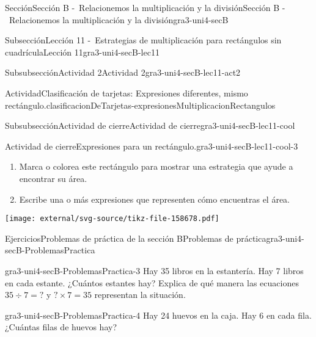 \documentclass[twoside,14pt,]{extarticle}
\begin{document}
\begin{sectionptx}{Sección}{Sección B -~Relacionemos la multiplicación y la división}{}{Sección B -~Relacionemos la multiplicación y la división}{}{}{gra3-uni4-secB}
\begin{subsectionptx}{Subsección}{Lección 11 -~Estrategias de multiplicación para rectángulos sin cuadrícula}{}{Lección 11}{}{}{gra3-uni4-secB-lec11}
\begin{subsubsectionptx}{Subsubsección}{Actividad 2}{}{Actividad 2}{}{}{gra3-uni4-secB-lec11-act2}
\begin{activity}{Actividad}{Clasificación de tarjetas: Expresiones diferentes, mismo rectángulo.}{clasificacionDeTarjetas-expresionesMultiplicacionRectangulos}
\begin{image}{0}{1}{0}{}
\end{image}%
\end{activity}%
\end{subsubsectionptx}
%
%
\typeout{************************************************}
\typeout{************************************************}
%
\begin{subsubsectionptx}{Subsubsección}{Actividad de cierre}{}{Actividad de cierre}{}{}{gra3-uni4-secB-lec11-cool}
\begin{project}{Actividad de cierre}{Expresiones para un rectángulo.}{gra3-uni4-secB-lec11-cool-3}%
\begin{sidebyside}{2}{0}{0}{0}%
\begin{sbspanel}{0.6}%
%
\begin{enumerate}
\item{}Marca o colorea este rectángulo para mostrar una estrategia que ayude a encontrar su área.%
\item{}Escribe una o más expresiones que representen cómo encuentras el área.%
\end{enumerate}
\end{sbspanel}%
\begin{sbspanel}{0.4}%
\texttt{[image: external/svg-source/tikz-file-158678.pdf]}
\end{sbspanel}%
\end{sidebyside}%
\end{project}%
\end{subsubsectionptx}
\end{subsectionptx}
%
%
\typeout{************************************************}
\typeout{************************************************}
%
\begin{exercises-subsection}{Ejercicios}{Problemas de práctica de la sección B}{}{Problemas de práctica}{}{}{gra3-uni4-secB-ProblemasPractica}
\begin{divisionexercise}{1}{}{}{gra3-uni4-secB-ProblemasPractica-3}%
Hay 35 libros en la estantería. Hay 7 libros en cada estante. ¿Cuántos estantes hay? Explica de qué manera las ecuaciones \(35 ÷ 7 = {?}\) y \({?} × 7 = 35\) representan la situación.%
\end{divisionexercise}%
\begin{divisionexercise}{2}{}{}{gra3-uni4-secB-ProblemasPractica-4}%
Hay 24 huevos en la caja. Hay 6 en cada fila. ¿Cuántas filas de huevos hay?%
\par

\end{divisionexercise}
\end{exercises-subsection}
\end{sectionptx}
\end{document}
